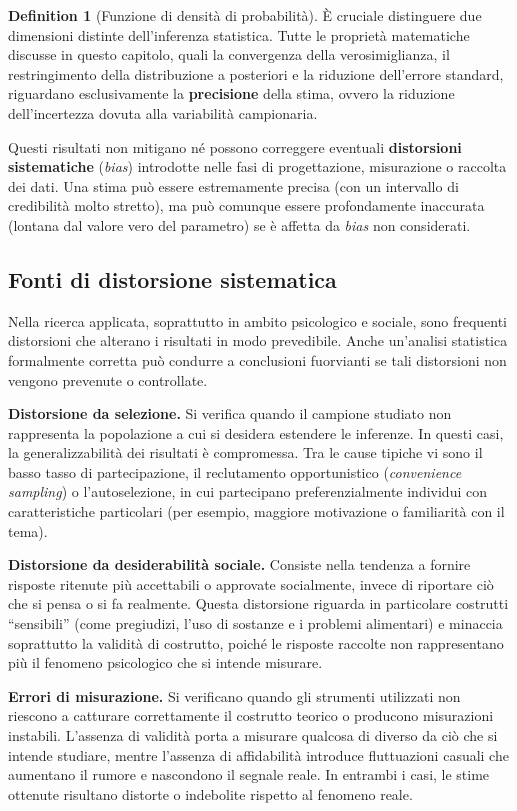 \documentclass[
  letterpaper,
  DIV=11,
  numbers=noendperiod,
  oneside]{scrreprt}
\theoremstyle{definition}
\theoremstyle{plain}
\theoremstyle{definition}
\newtheorem{definition}{Definition}[chapter]
\theoremstyle{remark}
\begin{document}
\begin{definition}[Funzione di densità di
probabilità]
È cruciale distinguere due dimensioni distinte dell'inferenza
statistica. Tutte le proprietà matematiche discusse in questo capitolo,
quali la convergenza della verosimiglianza, il restringimento della
distribuzione a posteriori e la riduzione dell'errore standard,
riguardano esclusivamente la \textbf{precisione} della stima, ovvero la
riduzione dell'incertezza dovuta alla variabilità campionaria.

Questi risultati non mitigano né possono correggere eventuali
\textbf{distorsioni sistematiche} (\emph{bias}) introdotte nelle fasi di
progettazione, misurazione o raccolta dei dati. Una stima può essere
estremamente precisa (con un intervallo di credibilità molto stretto),
ma può comunque essere profondamente inaccurata (lontana dal valore vero
del parametro) se è affetta da \emph{bias} non considerati.

\subsection{Fonti di distorsione
sistematica}\label{fonti-di-distorsione-sistematica}

Nella ricerca applicata, soprattutto in ambito psicologico e sociale,
sono frequenti distorsioni che alterano i risultati in modo prevedibile.
Anche un'analisi statistica formalmente corretta può condurre a
conclusioni fuorvianti se tali distorsioni non vengono prevenute o
controllate.

\textbf{Distorsione da selezione.} Si verifica quando il campione
studiato non rappresenta la popolazione a cui si desidera estendere le
inferenze. In questi casi, la generalizzabilità dei risultati è
compromessa. Tra le cause tipiche vi sono il basso tasso di
partecipazione, il reclutamento opportunistico (\emph{convenience
sampling}) o l'autoselezione, in cui partecipano preferenzialmente
individui con caratteristiche particolari (per esempio, maggiore
motivazione o familiarità con il tema).

\textbf{Distorsione da desiderabilità sociale.} Consiste nella tendenza
a fornire risposte ritenute più accettabili o approvate socialmente,
invece di riportare ciò che si pensa o si fa realmente. Questa
distorsione riguarda in particolare costrutti ``sensibili'' (come
pregiudizi, l'uso di sostanze e i problemi alimentari) e minaccia
soprattutto la validità di costrutto, poiché le risposte raccolte non
rappresentano più il fenomeno psicologico che si intende misurare.

\textbf{Errori di misurazione.} Si verificano quando gli strumenti
utilizzati non riescono a catturare correttamente il costrutto teorico o
producono misurazioni instabili. L'assenza di validità porta a misurare
qualcosa di diverso da ciò che si intende studiare, mentre l'assenza di
affidabilità introduce fluttuazioni casuali che aumentano il rumore e
nascondono il segnale reale. In entrambi i casi, le stime ottenute
risultano distorte o indebolite rispetto al fenomeno reale.


\end{definition}
\end{document}
